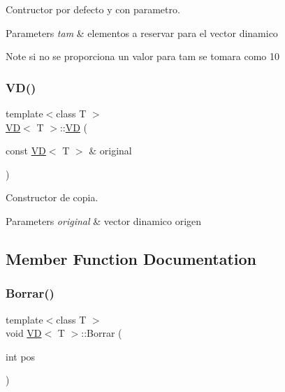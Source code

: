 Contructor por defecto y con parametro. 


\begin{DoxyParams}{Parameters}
{\em tam} & elementos a reservar para el vector dinamico \\
\hline
\end{DoxyParams}
\begin{DoxyNote}{Note}
si no se proporciona un valor para tam se tomara como 10 
\end{DoxyNote}
\mbox{\label{class_v_d_a4f22b92dd8ace25d50311ccd61508dfc}} 
\subsubsection{\texorpdfstring{V\+D()}{VD()}\hspace{0.1cm}{\footnotesize\ttfamily [2/2]}}
{\footnotesize\ttfamily template$<$class T $>$ \\
\hyperlink{class_v_d}{VD}$<$ T $>$\+::\hyperlink{class_v_d}{VD} (\begin{DoxyParamCaption}\item[{const \hyperlink{class_v_d}{VD}$<$ T $>$ \&}]{original }\end{DoxyParamCaption})}



Constructor de copia. 


\begin{DoxyParams}{Parameters}
{\em original} & vector dinamico origen \\
\hline
\end{DoxyParams}


\subsection{Member Function Documentation}
\mbox{\label{class_v_d_a13528c6fae34510d10699f426de88e27}} 
\subsubsection{\texorpdfstring{Borrar()}{Borrar()}}
{\footnotesize\ttfamily template$<$class T $>$ \\
void \hyperlink{class_v_d}{VD}$<$ T $>$\+::Borrar (\begin{DoxyParamCaption}\item[{int}]{pos }\end{DoxyParamCaption})}



